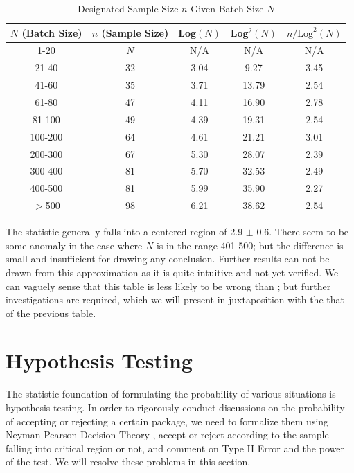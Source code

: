 \documentclass[12pt]{article}
\begin{document}
\begin{table}[htbp]
    \centering
    \begin{tabular}{ccccc}
        \toprule
        $N$ (Batch Size) & $n$ (Sample Size) & Log$(N)$ & Log$^2(N)$ & $n/\text{Log}^2(N)$ \\
        \midrule
        1-20 & $N$ & N/A & N/A & N/A \\
        21-40   & 32 & 3.04 & 9.27  & 3.45 \\
        41-60   & 35 & 3.71 & 13.79 & 2.54 \\
        61-80   & 47 & 4.11 & 16.90 & 2.78 \\
        81-100  & 49 & 4.39 & 19.31 & 2.54 \\
        100-200 & 64 & 4.61 & 21.21 & 3.01 \\
        200-300 & 67 & 5.30 & 28.07 & 2.39 \\
        300-400 & 81 & 5.70 & 32.53 & 2.49 \\
        400-500 & 81 & 5.99 & 35.90 & 2.27 \\
        $>$500  & 98 & 6.21 & 38.62 & 2.54 \\
        \bottomrule
    \end{tabular}
    \caption{Designated Sample Size $n$ Given Batch Size $N$}
\end{table}

The statistic generally falls into a centered region of 2.9 $\pm$ 0.6. There seem to be some anomaly in the case where $N$ is in the range 401-500; but the difference is small and insufficient for drawing any conclusion. Further results can not be drawn from this approximation as it is quite intuitive and not yet verified. We can vaguely sense that this table is less likely to be wrong than \cite{JJF2005}; but further investigations are required, which we will present in juxtaposition with the that of the previous table. 

\section{Hypothesis Testing}

The statistic foundation of formulating the probability of various situations is hypothesis testing. In order to rigorously conduct discussions on the probability of accepting or rejecting a certain package, we need to formalize them using Neyman-Pearson Decision Theory \cite{Ho2023}, accept or reject according to the sample falling into critical region or not, and comment on Type II Error and the power of the test. We will resolve these problems in this section.
\end{document}
